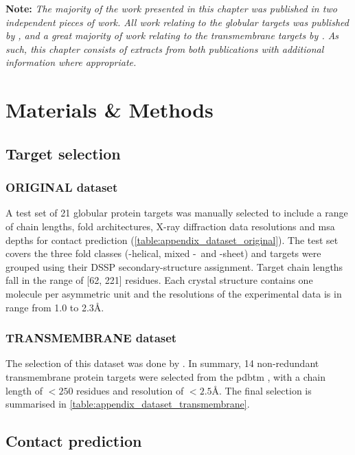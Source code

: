 \textbf{Note: }\textit{The majority of the work presented in this chapter was published in two independent pieces of work. All work relating to the globular targets was published by \textcite{Simkovic2016-wk}, and a great majority of work relating to the transmembrane targets by \textcite{Thomas2017-sh}. As such, this chapter consists of extracts from both publications with additional information where appropriate.}

\section{Materials \& Methods}
\subsection{Target selection}
\subsubsection{ORIGINAL dataset} \label{sec:methods_dataset_original}
A test set of 21 globular protein targets was manually selected to include a range of chain lengths, fold architectures, X-ray diffraction data resolutions and \gls{msa} depths for contact prediction  (\cref{table:appendix_dataset_original}). The test set covers the three fold classes (\textalpha-helical, mixed \textalpha-\textbeta\ and \textbeta-sheet) and targets were grouped using their DSSP \cite{Kabsch1983-rr} secondary-structure assignment. Target chain lengths fall in the range of [62, 221] residues. Each crystal structure contains one molecule per asymmetric unit and the resolutions of the experimental data is in range from 1.0 to 2.3\AA.

\subsubsection{TRANSMEMBRANE dataset} \label{sec:methods_dataset_transmembrane}
The selection of this dataset was done by \cite{Thomas2017-sh}. In summary, 14 non-redundant transmembrane protein targets were selected from the \gls{pdbtm} \cite{Tusnady2005-ns}, with a chain length of $<250$ residues and resolution of $<2.5$\AA. The final selection is summarised in \cref{table:appendix_dataset_transmembrane}.

\subsection{Contact prediction}
